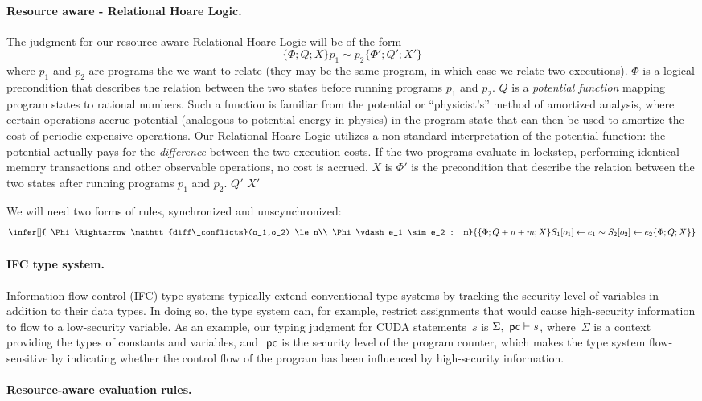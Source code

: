 \paragraph{Resource aware - Relational Hoare Logic.}
The judgment for our resource-aware Relational Hoare Logic will be of the form 
%
\[\{\Phi; Q; X\} p_1 \sim p_2 \{\Phi'; Q'; X'\}\]
%
where $p_1$ and $p_2$ are programs the we want to relate (they may be the same program, in which case we relate two executions).%
$\Phi$ is a logical precondition that describes the relation between the two states before running programs $p_1$ and $p_2$. 
%
$Q$ is a {\em potential function} mapping program states to rational numbers.
%
Such a function is familiar from the potential or ``physicist's'' method of amortized analysis, where certain operations accrue potential (analogous to potential energy in physics) in the program state that can then be used to amortize the cost of periodic expensive operations.
%
Our Relational Hoare Logic utilizes a non-standard interpretation of the potential function: the potential actually pays for the {\em difference} between the two execution costs.
%
If the two programs evaluate in lockstep, performing identical memory transactions and other observable operations, no cost is accrued.
%
$X$ is
%
$\Phi'$ is the precondition that describe the relation between the two states after running programs $p_1$ and $p_2$.
%
$Q'$
%
$X'$

We will need two forms of rules, synchronized and unscynchronized:
\[
\infer[]{ \Phi \Rightarrow \mathtt{diff\_conflicts}(o_1,o_2) \le n\\  \Phi \vdash e_1 \sim e_2 : m}{\{\Phi; Q+n+m; X\} S_1[o_1] \leftarrow e_1 \sim S_2[o_2] \leftarrow e_2 \{\Phi; Q; X\}  }
\]

\paragraph{IFC type system.}
Information flow control (IFC) type systems typically extend conventional type systems by tracking the security level of variables in addition to their data types.
%
In doing so, the type system can, for example, restrict assignments that would
cause high-security information to flow to a low-security variable.
%
As an example, our typing judgment for CUDA statements~$s$ is
$\Sigma, ~\mathsf{pc} \vdash s$,
where~$\Sigma$ is a context providing the types of constants and variables,
and $~\mathsf{pc}$ is the security level of the program counter, which makes the type
system flow-sensitive by indicating whether the control flow of the program
has been influenced by high-security information.


\paragraph{Resource-aware evaluation rules.}



